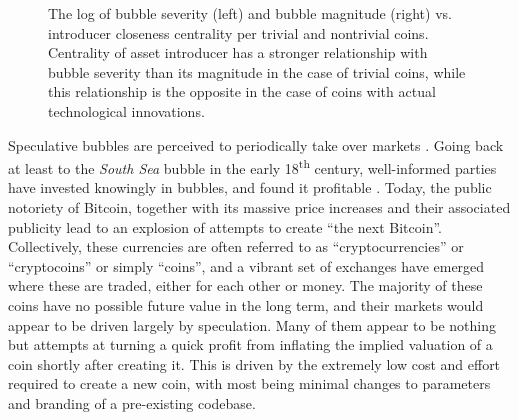 \begin{figure*}
\centering
\begin{subfigure}
{\texttt{[image: log\_severity\_centrality.pdf]}}
\end{subfigure}
\begin{subfigure}
{\texttt{[image: log\_volume\_centrality.pdf]}}
\end{subfigure}
\label{volume_severity_centrality}
\caption{The log of bubble severity (left) and bubble magnitude (right) vs. introducer closeness centrality per trivial and nontrivial coins. Centrality of asset introducer has a stronger relationship with bubble severity than its magnitude in the case of trivial coins, while this relationship is the opposite in the case of coins with actual technological innovations.}
\end{figure*}

Speculative bubbles are perceived to periodically take over markets \cite{garber2001famous}.
Going back at least to the \emph{South Sea} bubble in the early 18\textsuperscript{th} century, well-informed parties  have invested knowingly in bubbles, and found it profitable \cite{temin2004riding}.
Today, the public notoriety of Bitcoin, together with its massive price increases and their associated publicity lead to an explosion of attempts to create ``the next Bitcoin''.
Collectively, these currencies are often referred to as ``cryptocurrencies'' or ``cryptocoins'' or simply ``coins'', and a vibrant set of exchanges have emerged where these are traded, either for each other or money.
The majority of these coins have no possible future value in the long term, and their markets would appear to be driven largely by speculation.
Many of them appear to be nothing but attempts at turning a quick profit from inflating the implied valuation of a coin shortly after creating it.
This is driven by the extremely low cost and effort required to create a new coin, with most being minimal changes to parameters and branding of a pre-existing codebase.

